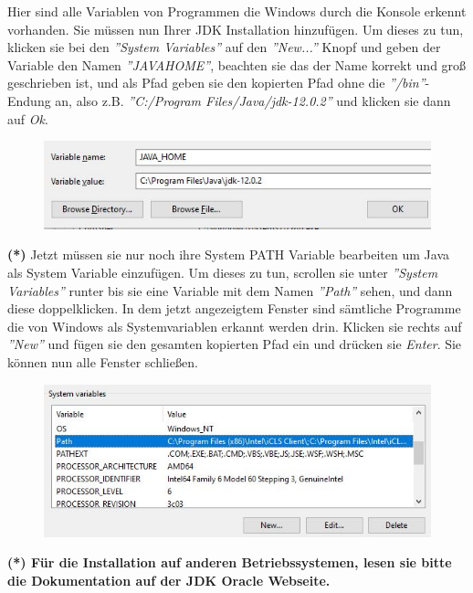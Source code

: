 \documentclass[fontsize=12pt,paper=a4,twoside]{scrartcl}
\begin{document}
Hier sind alle Variablen von Programmen die Windows durch die Konsole erkennt vorhanden. Sie müssen nun Ihrer JDK Installation hinzufügen. Um dieses zu tun, klicken sie bei den \textit{''System Variables''} auf den \textit{''New...''} Knopf und geben der Variable den Namen \textit{''JAVA\textunderscore HOME''}, beachten sie das der Name korrekt und groß geschrieben ist, und als Pfad geben sie den kopierten Pfad ohne die \textit{''/bin''}-Endung an, also z.B. \textit{''C:/Program Files/Java/jdk-12.0.2''} und klicken sie dann auf \textit{Ok}.
\begin{figure}[H]
\centering
\includegraphics[width=\linewidth]{JAVA_HOME.JPG}
\end{figure} 

\textbf{(*)}
Jetzt müssen sie nur noch ihre System PATH Variable bearbeiten um Java als System Variable einzufügen. Um dieses zu tun, scrollen sie unter \textit{''System Variables''} runter bis sie eine Variable mit dem Namen \textit{''Path''} sehen, und dann diese doppelklicken. In dem jetzt angezeigtem Fenster sind sämtliche Programme die von Windows als Systemvariablen erkannt werden drin. Klicken sie rechts auf \textit{''New''} und fügen sie den gesamten kopierten Pfad ein und drücken sie \textit{Enter}. Sie können nun alle Fenster schließen. 
\begin{figure}[H]
\centering
\includegraphics[width=\linewidth]{SystemVariables.JPG}
\end{figure} 

\textbf{(*) Für die Installation auf anderen Betriebssystemen, lesen sie bitte die Dokumentation auf der JDK Oracle Webseite.}

\end{document}
